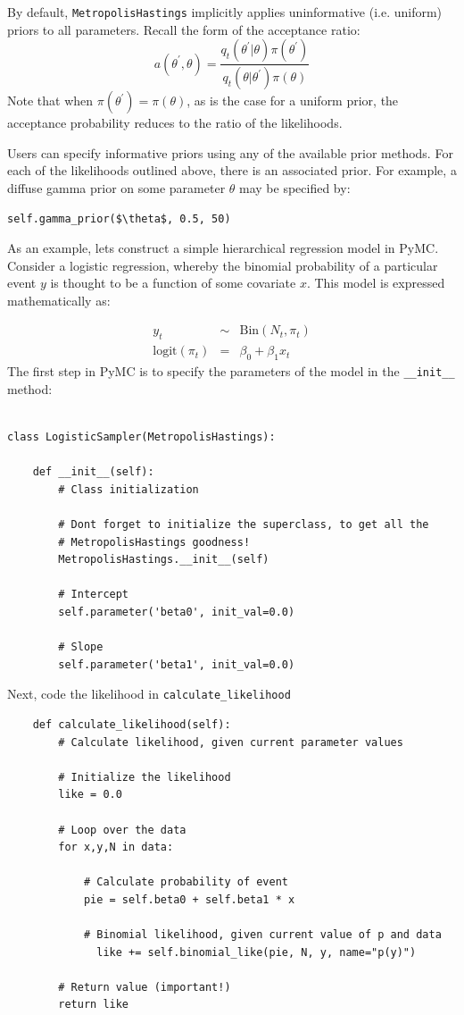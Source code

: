 \documentclass[]{book}
\begin{document}
By default, \verb=MetropolisHastings= implicitly applies uninformative (i.e. uniform) priors to all parameters. Recall the form of the acceptance ratio:
\[
a(\theta^{\prime},\theta) = \frac{q_t(\theta^{\prime} | \theta) \pi(\theta^{\prime})}{q_t(\theta | \theta^{\prime}) \pi(\theta)}
\]
Note that when $\pi(\theta^{\prime}) = \pi(\theta)$, as is the case for a uniform prior, the acceptance probability reduces to the ratio of the likelihoods.

Users can specify informative priors using any of the available prior methods. For each of the likelihoods outlined above, there is an associated prior. For example, a diffuse gamma prior on some parameter $\theta$ may be specified by:
\begin{verbatim}
self.gamma_prior($\theta$, 0.5, 50)
\end{verbatim}

As an example, lets construct a simple hierarchical regression model in PyMC. Consider a logistic regression, whereby the binomial probability of a particular event $y$ is thought to be a function of some covariate $x$. This model is expressed mathematically as:

\begin{eqnarray*}
    y_t &\sim& \mbox{Bin}(N_t, \pi_t) \\
    \mbox{logit}(\pi_t) &=& \beta_0 + \beta_1 x_t
\end{eqnarray*}
The first step in PyMC is to specify the parameters of the model in the \verb=__init__= method:
\begin{verbatim}

class LogisticSampler(MetropolisHastings):

    def __init__(self):
        # Class initialization

        # Dont forget to initialize the superclass, to get all the
        # MetropolisHastings goodness!
        MetropolisHastings.__init__(self)

        # Intercept
        self.parameter('beta0', init_val=0.0)

        # Slope
        self.parameter('beta1', init_val=0.0)
\end{verbatim}
Next, code the likelihood in \verb=calculate_likelihood=
\begin{verbatim}
    def calculate_likelihood(self):
        # Calculate likelihood, given current parameter values

        # Initialize the likelihood
        like = 0.0

        # Loop over the data
        for x,y,N in data:

            # Calculate probability of event
            pie = self.beta0 + self.beta1 * x

            # Binomial likelihood, given current value of p and data
              like += self.binomial_like(pie, N, y, name="p(y)")

        # Return value (important!)
        return like
\end{verbatim}
\end{document}
